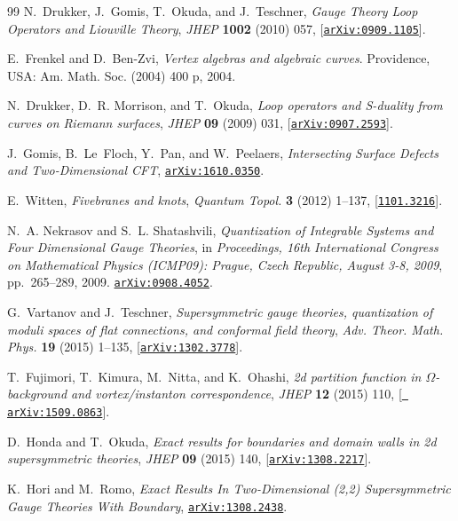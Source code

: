 \begin{thebibliography}{99}
N.~Drukker, J.~Gomis, T.~Okuda, and J.~Teschner, {\it {Gauge Theory Loop
  Operators and Liouville Theory}},  {\em JHEP} {\bf 1002} (2010) 057,
  [\href{http://xxx.lanl.gov/abs/0909.1105}{{\tt arXiv:0909.1105}}].

E.~Frenkel and D.~Ben-Zvi, {\em {Vertex algebras and algebraic curves}}.
\newblock Providence, USA: Am. Math. Soc. (2004) 400 p, 2004.

N.~Drukker, D.~R. Morrison, and T.~Okuda, {\it {Loop operators and S-duality
  from curves on Riemann surfaces}},  {\em JHEP} {\bf 09} (2009) 031,
  [\href{http://xxx.lanl.gov/abs/0907.2593}{{\tt arXiv:0907.2593}}].

J.~Gomis, B.~Le~Floch, Y.~Pan, and W.~Peelaers, {\it {Intersecting Surface
  Defects and Two-Dimensional CFT}},
  \href{http://xxx.lanl.gov/abs/1610.0350}{{\tt arXiv:1610.0350}}.

E.~Witten, {\it {Fivebranes and knots}},  {\em Quantum Topol.} {\bf 3} (2012)
  1--137, [\href{http://xxx.lanl.gov/abs/1101.3216}{{\tt 1101.3216}}].

N.~A. Nekrasov and S.~L. Shatashvili, {\it {Quantization of Integrable Systems
  and Four Dimensional Gauge Theories}},  in {\em {Proceedings, 16th
  International Congress on Mathematical Physics (ICMP09): Prague, Czech
  Republic, August 3-8, 2009}}, pp.~265--289, 2009.
\newblock \href{http://xxx.lanl.gov/abs/0908.4052}{{\tt arXiv:0908.4052}}.

G.~Vartanov and J.~Teschner, {\it {Supersymmetric gauge theories, quantization
  of moduli spaces of flat connections, and conformal field theory}},  {\em
  Adv. Theor. Math. Phys.} {\bf 19} (2015) 1--135,
  [\href{http://xxx.lanl.gov/abs/1302.3778}{{\tt arXiv:1302.3778}}].

T.~Fujimori, T.~Kimura, M.~Nitta, and K.~Ohashi, {\it {2d partition function in
  $\Omega$-background and vortex/instanton correspondence}},  {\em JHEP} {\bf
  12} (2015) 110, [\href{http://xxx.lanl.gov/abs/1509.0863}{{\tt
  arXiv:1509.0863}}].

D.~Honda and T.~Okuda, {\it {Exact results for boundaries and domain walls in
  2d supersymmetric theories}},  {\em JHEP} {\bf 09} (2015) 140,
  [\href{http://xxx.lanl.gov/abs/1308.2217}{{\tt arXiv:1308.2217}}].

K.~Hori and M.~Romo, {\it {Exact Results In Two-Dimensional (2,2)
  Supersymmetric Gauge Theories With Boundary}},
  \href{http://xxx.lanl.gov/abs/1308.2438}{{\tt arXiv:1308.2438}}.


\end{thebibliography}
